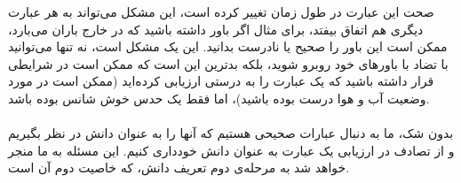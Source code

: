 \documentclass[10pt,a4paper]{article}
\begin{document}
                    صحت این عبارت در طول زمان تغییر کرده است، این مشکل می‌تواند به هر عبارت دیگری هم اتفاق بیفتد، برای مثال اگر باور داشته باشید که در خارج باران می‌بارد، ممکن است این باور را صحیح یا نادرست بدانید. این یک مشکل است، نه تنها می‌توانید با تضاد با باورهای خود روبرو شوید، بلکه بدترین این است که ممکن است در شرایطی قرار داشته باشید که یک عبارت را به درستی ارزیابی کرده‌اید (ممکن است در مورد وضعیت آب و هوا درست بوده باشید)، اما فقط یک حدس خوش شانس بوده باشد.
                    \\
                    \\
                    بدون شک، ما به دنبال عبارات صحیحی هستیم که آنها را به عنوان دانش در نظر بگیریم و از تصادف در ارزیابی یک عبارت به عنوان دانش خودداری کنیم. این مسئله به ما منجر خواهد شد به مرحله‌ی دوم تعریف دانش، که خاصیت دوم آن است.
                    \\
                    \\
\end{document}
